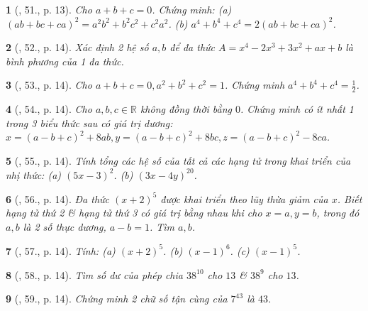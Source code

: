\documentclass{article}
\newtheorem{baitoan}{}
\begin{document}
\begin{baitoan}[\cite{Tuyen_Toan_8}, 51., p. 13]
	Cho $a + b + c = 0$. Chứng minh: (a) $(ab + bc + ca)^2 = a^2b^2 + b^2c^2 + c^2a^2$. (b) $a^4 + b^4 + c^4 = 2(ab + bc + ca)^2$.
\end{baitoan}

\begin{baitoan}[\cite{Tuyen_Toan_8}, 52., p. 14]
	Xác định 2 hệ số $a,b$ để đa thức $A = x^4 - 2x^3 + 3x^2 + ax + b$ là bình phương của 1 đa thức.
\end{baitoan}

\begin{baitoan}[\cite{Tuyen_Toan_8}, 53., p. 14]
	Cho $a + b + c = 0,a^2 + b^2 + c^2 = 1$. Chứng minh $a^4 + b^4 + c^4 = \frac{1}{2}$.
\end{baitoan}

\begin{baitoan}[\cite{Tuyen_Toan_8}, 54., p. 14]
	Cho $a,b,c\in\mathbb{R}$ không đồng thời bằng $0$. Chứng minh có ít nhất 1 trong 3 biểu thức sau có giá trị dương: $x = (a - b + c)^2 + 8ab,y = (a - b + c)^2 + 8bc,z = (a - b + c)^2 - 8ca$.
\end{baitoan}

\begin{baitoan}[\cite{Tuyen_Toan_8}, 55., p. 14]
	Tính tổng các hệ số của tất cả các hạng tử trong khai triển của nhị thức: (a) $(5x - 3)^2$. (b) $(3x - 4y)^{20}$.
\end{baitoan}

\begin{baitoan}[\cite{Tuyen_Toan_8}, 56., p. 14]
	Đa thức $(x + 2)^5$ được khai triển theo lũy thừa giảm của $x$. Biết hạng tử thứ 2 \& hạng tử thứ 3 có giá trị bằng nhau khi cho $x = a,y = b$, trong đó $a,b$ là 2 số thực dương, $a - b = 1$. Tìm $a,b$.
\end{baitoan}

\begin{baitoan}[\cite{Tuyen_Toan_8}, 57., p. 14]
	Tính: (a) $(x + 2)^5$. (b) $(x - 1)^6$. (c) $(x - 1)^5$.
\end{baitoan}

\begin{baitoan}[\cite{Tuyen_Toan_8}, 58., p. 14]
	Tìm số dư của phép chia $38^{10}$ cho $13$ \& $38^9$ cho $13$.
\end{baitoan}

\begin{baitoan}[\cite{Tuyen_Toan_8}, 59., p. 14]
	Chứng minh 2 chữ số tận cùng của $7^{43}$ là $43$.
\end{baitoan}
\end{document}
